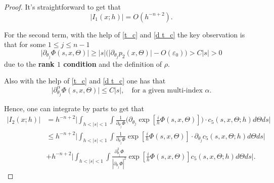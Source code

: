 \documentclass[12pt,reqno]{amsart}
\renewcommand{\epsilon}{\varepsilon}
\numberwithin{equation}{section}
\begin{document}
\begin{proof}
\noindent It's straightforward to get that 
\begin{equation}\label{last1}
\Big| {I}_1 (x; h)\Big|=O(h^{-n+2}).
\end{equation}

\noindent %
For the second term, with the help of \eqref{t_c} and \eqref{d t_c} the key observation is that for some $1\leq j\leq n-1$
\begin{equation}\label{phi low}
\big| \partial_{\theta_j} \Phi(s,x,\Theta) \big|\geq|s| \big(\big|\partial_{\theta_j} p_2(x, \Theta)\big|-O(\epsilon_0)\big)>C|s|>0
\end{equation}
due to the {\bf rank $1$ condition}  and the definition of $\rho$.

Also with the help of \eqref{t_c} and \eqref{d t_c} one has that
\begin{equation}\label{phi up}
\big|\partial_{\theta_j}^\alpha \Phi(s,x,\Theta)\big|\leq C|s|, \quad\text{for a given multi-index } \alpha.
\end{equation}


Hence, one can integrate by parts to get that
\begin{align}\label{last2}
\Big| {I}_2 (x; h) \Big|&=h^{-n+2} \Big|\int_{h<|s|<1} \int \frac{1}{\partial_{\theta_j} \Phi} \big(\partial_{\theta_j} \exp[\frac{i}h  \Phi(s,x,\Theta)]\big)  \cdot c_5(s, x, \Theta; h) d\Theta ds\Big| \nonumber\\
&\leq h^{-n+2}\Big|\int_{h<|s|<1} \int \frac{1}{\partial_{\theta_j} \Phi} \exp[\frac{i}h  \Phi(s,x,\Theta)]  \cdot \partial_{\theta_j} c_5(s, x, \Theta; h) d\Theta ds\Big| \nonumber\\
&+ h^{-n+2} \Big|\int_{h<|s|<1} \int \frac{\partial^2_{\theta_j}\Phi }{|\partial_{\theta_j} \Phi|^2}   \exp[\frac{i}h  \Phi(s,x,\Theta)] c_5(s, x, \Theta; h) d\Theta ds\Big|. \nonumber
\end{align}


\end{proof}
\end{document}
